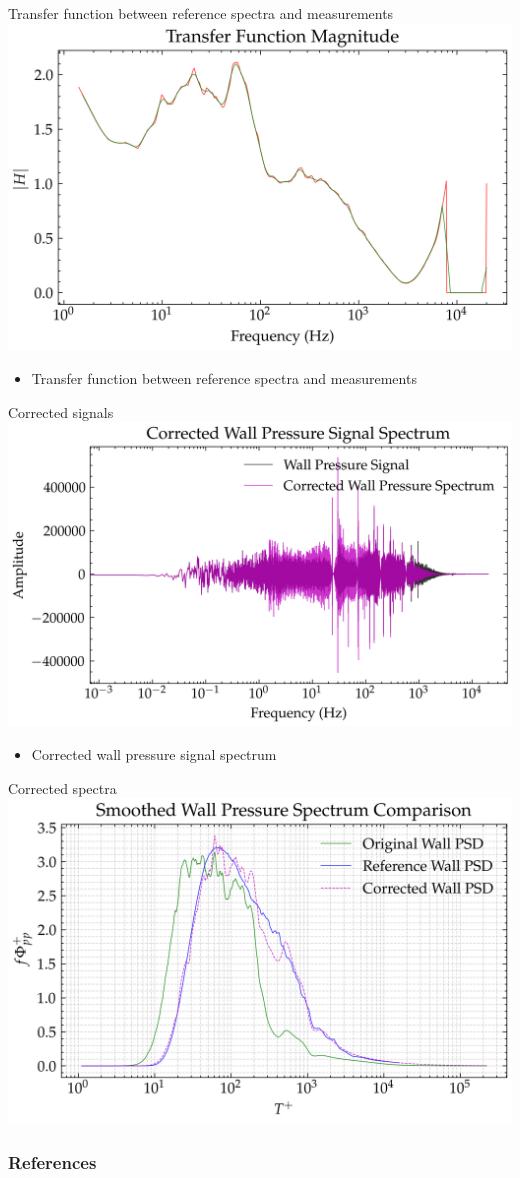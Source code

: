 \documentclass[aspectratio=169]{beamer}
\begin{document}
\begin{frame}{Transfer function between reference spectra and measurements}
    \centering
    \includegraphics[width=0.7\linewidth]{figures/transfer_function_magnitude.png}
    \begin{itemize}
        \centering
        \item Transfer function between reference spectra and measurements
    \end{itemize}
\end{frame}

\begin{frame}{Corrected signals}
    \centering
    \includegraphics[width=0.7\linewidth]{figures/corrected_wall_pressure_signal_spectrum.png}
    \begin{itemize}
        \centering
        \item Corrected wall pressure signal spectrum
    \end{itemize}
\end{frame}

\begin{frame}{Corrected spectra}
    \centering
    \includegraphics[width=0.7\linewidth]{figures/corrected_wall_pressure_spectrum.png}
\end{frame}

\begin{frame}
    \frametitle{References}
    
    
\end{frame}

% 
\end{document}
